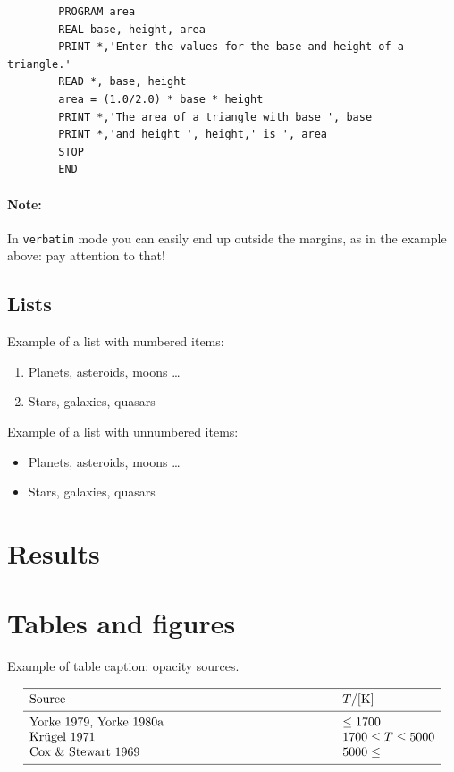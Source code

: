 \documentclass[a4paper,10pt]{article}
\begin{document}
\begin{verbatim}
        PROGRAM area
        REAL base, height, area
        PRINT *,'Enter the values for the base and height of a triangle.'
        READ *, base, height
        area = (1.0/2.0) * base * height
        PRINT *,'The area of a triangle with base ', base
        PRINT *,'and height ', height,' is ', area
        STOP
        END
\end{verbatim}

\paragraph{Note:}
In \texttt{verbatim} mode you can easily end up outside the
margins, as in the example above: pay attention to that!

\subsection{Lists}
Example of a list with numbered items:

   \begin{enumerate}
      \item  Planets, asteroids, moons \ldots
      \item  Stars, galaxies, quasars
  \end{enumerate}

Example of a list with unnumbered items:

   \begin{itemize}
      \item  Planets, asteroids, moons \ldots
      \item  Stars, galaxies, quasars
          
   \end{itemize}

\section{Results}

\newpage
\section{Tables and figures}




\begin{table}[htb]
      \caption[]{Example of table caption: opacity sources.}
         \label{KapSou}
     $$ 
         \begin{array}{p{0.7\linewidth}l}
            \hline
            \noalign{\smallskip}
            Source      &  T / {[\mathrm{K}]} \\
            \noalign{\smallskip}
            \hline
            \noalign{\smallskip}
            Yorke 1979, Yorke 1980a & \leq 1700           \\
            Kr\"ugel 1971           & 1700 \leq T \leq 5000 \\
            Cox \& Stewart 1969     & 5000 \leq             \\
            \noalign{\smallskip}
            \hline
         \end{array}
     $$ 
\end{table}
\end{document}
